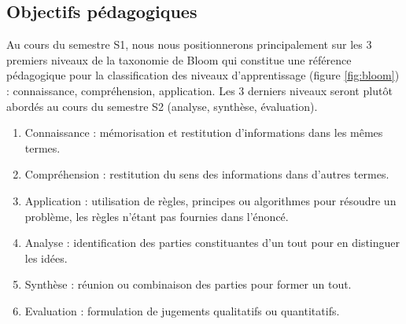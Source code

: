\subsection{Objectifs pédagogiques}\label{sub:pedago}
Au cours du semestre S1, nous nous positionnerons principalement sur les 3 premiers 
niveaux de la taxonomie de Bloom qui constitue une référence pédagogique pour la 
classification des 
niveaux d'apprentissage (figure \ref{fig:bloom}) : connaissance, compréhension, application. 
Les 3 derniers niveaux seront plutôt abordés au cours 
du semestre S2 (analyse, synthèse, évaluation).
\begin{enumerate}
\item Connaissance : mémorisation et restitution d'informations dans les mêmes termes.
\item Compréhension : restitution du sens des informations dans d'autres termes.
\item Application : utilisation de règles, principes ou algorithmes pour résoudre un problème, les règles 
	n'étant pas fournies dans l'énoncé.
\item Analyse : identification des parties constituantes d'un tout pour en distinguer les idées.
\item Synthèse : réunion ou combinaison des parties pour former un tout.
\item Evaluation : formulation de jugements qualitatifs ou quantitatifs.
\end{enumerate}

